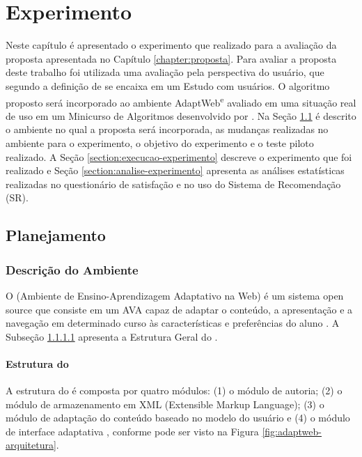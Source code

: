 \chapter{Experimento}\label{chapter:experimento}

Neste capítulo é apresentado o experimento que realizado para a avaliação da proposta apresentada no Capítulo \ref{chapter:proposta}.
Para avaliar a proposta deste trabalho foi utilizada uma avaliação pela perspectiva do usuário, que segundo a definição de
 se encaixa em um Estudo com usuários. O algoritmo proposto será incorporado ao ambiente
AdaptWeb\textsuperscript e avaliado em uma situação real de uso em um Minicurso de Algoritmos desenvolvido por .
Na Seção \ref{section:planejamento-experimento} é descrito o ambiente \adaptweb no qual a proposta será incorporada,
as mudanças realizadas no ambiente para o experimento, o objetivo do experimento e o teste piloto realizado. A Seção
\ref{section:execucao-experimento} descreve o experimento que foi realizado e Seção \ref{section:analise-experimento} apresenta
as análises estatísticas realizadas no questionário de satisfação e no uso do Sistema de Recomendação (SR).

\section{Planejamento}\label{section:planejamento-experimento}

\subsection{Descrição do Ambiente \adaptweb}

O \adaptweb (Ambiente de Ensino-Aprendizagem Adaptativo na Web) é um sistema open source
que consiste em um AVA capaz de adaptar o conteúdo, a apresentação e a navegação em determinado curso às características
e preferências do aluno \cite{gasparini2009adaptweb}. A Subseção \ref{subsection:estrutura-adaptweb} apresenta a Estrutura Geral do
\adaptweb.

\subsubsection{Estrutura do \adaptweb}\label{subsection:estrutura-adaptweb}

A estrutura do \adaptweb é composta por quatro módulos: (1) o módulo de autoria; (2) o
módulo de armazenamento em XML (Extensible Markup Language); (3) o módulo de adaptação do conteúdo baseado no modelo do
usuário e (4) o módulo de interface adaptativa \cite{gasparini2003interface}, conforme pode ser visto na Figura
\ref{fig:adaptweb-arquitetura}.

